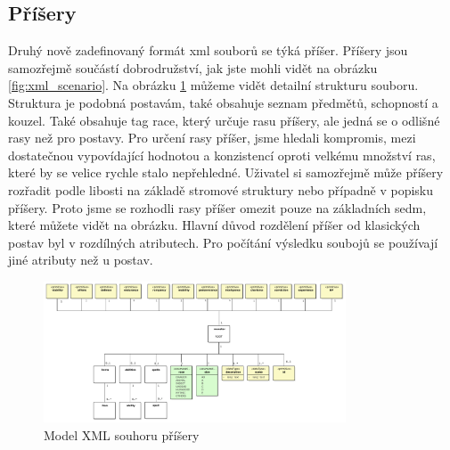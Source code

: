 \documentclass[thesis=B,czech]{resources/FITthesis}[2012/06/26]
\begin{document}
\subsection{Příšery}
Druhý nově zadefinovaný formát xml souborů se týká příšer. Příšery jsou samozřejmě součástí dobrodružství, jak jste mohli vidět na obrázku \ref{fig:xml_scenario}. Na obrázku \ref{fig:xml_monster} můžeme vidět detailní strukturu souboru. Struktura je podobná postavám, také obsahuje seznam předmětů, schopností a kouzel. Také obsahuje tag race, který určuje rasu příšery, ale jedná se o odlišné rasy než pro postavy. Pro určení rasy příšer, jsme hledali kompromis, mezi dostatečnou vypovídající hodnotou a konzistencí oproti velkému množství ras, které by se velice rychle stalo nepřehledné. Uživatel si samozřejmě může příšery rozřadit podle libosti na základě stromové struktury nebo případně v popisku příšery. Proto jsme se rozhodli rasy příšer omezit pouze na základních sedm, které můžete vidět na obrázku. Hlavní důvod rozdělení příšer od klasických postav byl v rozdílných atributech. Pro počítání výsledku soubojů se používají jiné atributy než u postav. 
\begin{figure}\centering
	\includegraphics[width=0.8\textwidth]{images/monsterXML}
	\caption[Model XML souhoru příšery]{Model XML souhoru příšery}\label{fig:xml_monster}
\end{figure}
\end{document}
